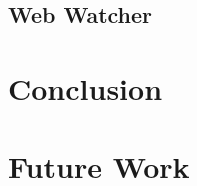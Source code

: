 \documentclass[11pt]{article}%
\begin{document}
\subsection{Web Watcher}


\section{Conclusion}


\section{Future Work}





\newpage
\appendix
\renewcommand\thesection{Appendix \Alph{section}\ \ \ --}
\end{document}
